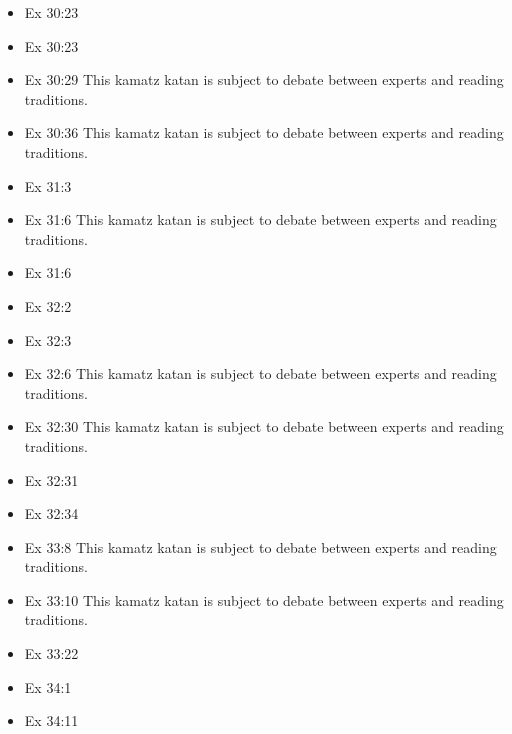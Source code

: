 \documentclass[14pt]{book}
\begin{document}
\begin{multicols}{2}
\begin{itemize}
\item Ex 30:23

\item Ex 30:23

\item Ex 30:29 This kamatz katan is subject to debate between experts and reading traditions.

\item Ex 30:36 This kamatz katan is subject to debate between experts and reading traditions.

\item Ex 31:3

\item Ex 31:6 This kamatz katan is subject to debate between experts and reading traditions.

\item Ex 31:6

\item Ex 32:2

\item Ex 32:3

\item Ex 32:6 This kamatz katan is subject to debate between experts and reading traditions.

\item Ex 32:30 This kamatz katan is subject to debate between experts and reading traditions.

\item Ex 32:31

\item Ex 32:34

\item Ex 33:8 This kamatz katan is subject to debate between experts and reading traditions.

\item Ex 33:10 This kamatz katan is subject to debate between experts and reading traditions.

\item Ex 33:22

\item Ex 34:1

\item Ex 34:11


\end{itemize}
\end{multicols}
\end{document}
